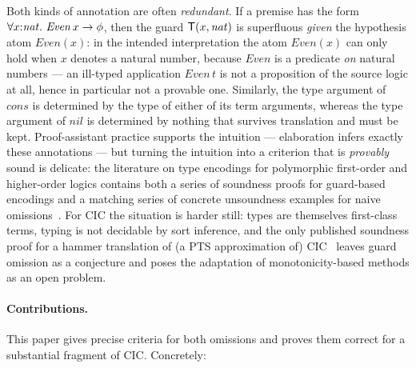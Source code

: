 Both kinds of annotation are often \emph{redundant}.  If a premise has the
form $\forall x{:}\mathit{nat}.\ \mathit{Even}\,x \imp \phi$, then the guard
$\mathsf{T}(x,\mathit{nat})$ is superfluous \emph{given} the hypothesis atom
$\mathit{Even}(x)$: in the intended interpretation the atom
$\mathit{Even}(x)$ can only hold when $x$ denotes a natural number, because
$\mathit{Even}$ is a predicate \emph{on} natural numbers --- an ill-typed
application $\mathit{Even}\,t$ is not a proposition of the source logic at
all, hence in particular not a provable one.  Similarly, the type argument of
$\mathit{cons}$ is determined by the type of either of its term arguments,
whereas the type argument of $\mathit{nil}$ is determined by nothing that
survives translation and must be kept.  Proof-assistant practice supports the
intuition --- elaboration infers exactly these annotations --- but turning the
intuition into a criterion that is \emph{provably} sound is delicate: the
literature on type encodings for polymorphic first-order and higher-order
logics contains both a series of soundness proofs for guard-based encodings
\cite{ClaessenLilliestromSmallbone2011,BlanchetteBohmePopescuSmallbone2016,
BobotPaskevich2011,CouchotLescuyer2007} and a matching series of concrete
unsoundness examples for naive omissions~\cite{MengPaulson2008,
BlanchetteBohmePopescuSmallbone2016}.  For CIC the situation is harder still:
types are themselves first-class terms, typing is not decidable by sort
inference, and the only published soundness proof for a hammer translation of
(a PTS approximation of) CIC~\cite{Czajka2018} leaves guard omission as a
conjecture and poses the adaptation of monotonicity-based methods as an open
problem.

\paragraph{Contributions.}
This paper gives precise criteria for both omissions and proves them correct
for a substantial fragment of CIC.  Concretely:

